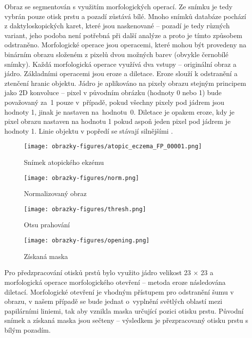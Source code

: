 Obraz se segmentován s využitím morfologických operací. Ze snímku je tedy vybrán pouze otisk prstu a pozadí zůstává bílé. Mnoho snímků databáze pochází z daktyloskopických karet, které jsou naskenované -- pozadí je tedy různých variant, jeho podoba není potřebná při další analýze a proto je tímto způsobem odstraněno. Morfologické operace jsou operacemi, které mohou být provedeny na binárním obrazu složeném z pixelů dvou možných barev (obvykle černobílé snímky). Každá morfologická operace využívá dva vstupy -- originální obraz a jádro. Základními operacemi jsou eroze a diletace. Eroze slouží k odstranění a ztenčení hranic objektu. Jádro je aplikováno na pixely obrazu stejným principem jako 2D konvoluce -- pixel v původním obrázku (hodnoty 0 nebo 1) bude považovaný za~1 pouze v~případě, pokud všechny pixely pod jádrem jsou hodnoty 1, jinak je nastaven na~hodnotu~0. Diletace je opakem eroze, kdy je pixel obrazu nastaven na hodnotu 1 pokud aspoň jeden pixel pod jádrem je hodnoty 1. Linie objektu v popředí se stávají silnějšími \cite{MorphologicalTransformations}. 

\begin{figure}[!htbp]
  \begin{minipage}[b]{0.5\linewidth}
    \centering
    \texttt{[image: obrazky-figures/atopic\_eczema\_FP\_00001.png]}
    \caption{Snímek atopického ekzému}
  \end{minipage}
  \hspace{0.5cm}
  \begin{minipage}[b]{0.5\linewidth}
    \centering
    \texttt{[image: obrazky-figures/norm.png]}
    \caption{Normalizovaný obraz}
  \end{minipage}
\end{figure}

\begin{figure}[!htbp]
  \begin{minipage}[b]{0.5\linewidth}
    \centering
    \texttt{[image: obrazky-figures/thresh.png]}
    \caption{Otsu prahování}
  \end{minipage}
  \hspace{0.5cm}
  \begin{minipage}[b]{0.5\linewidth}
    \centering
    \texttt{[image: obrazky-figures/opening.png]}
    \caption{Získaná maska}
  \end{minipage}
\end{figure}

Pro předzpracování otisků prstů bylo využito jádro velikost 23 $\times$ 23 a morfologická operace morfologického otevření -- metoda eroze následována diletací. Morfologické otevření je vhodným přístupem pro odstranění šumu v obrazu, v našem případě se bude jednat o~vyplnění světlých oblastí mezi papilárními liniemi, tak aby vznikla maska určující pozici otisku prstu. Původní snímek a získaná maska jsou sečteny -- výsledkem je přezpracovaný otisku prstu s bílým pozadím.

